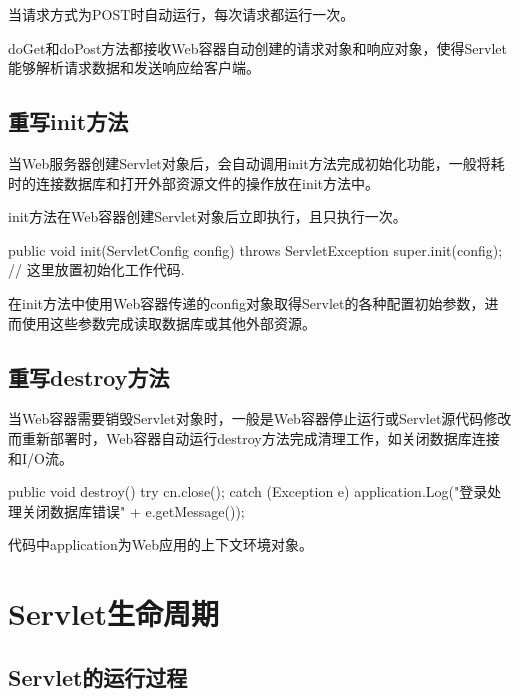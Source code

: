 当请求方式为POST时自动运行，每次请求都运行一次。

{\hei\Red doGet和doPost方法都接收Web容器自动创建的请求对象和响应对象，使得Servlet能够解析请求数据和发送响应给客户端。}

\subsection{重写init方法} 

当Web服务器创建Servlet对象后，会自动调用init方法完成初始化功能，一般将耗时的连接数据库和打开外部资源文件的操作放在init方法中。

init方法在Web容器创建Servlet对象后立即执行，且只执行一次。

\begin{javaCode}
  public void init(ServletConfig config) throws ServletException {
    super.init(config);
    // 这里放置初始化工作代码.
  }
\end{javaCode}

{\kai 在init方法中使用Web容器传递的config对象取得Servlet的各种配置初始参数，进而使用这些参数完成读取数据库或其他外部资源。}

\subsection{重写destroy方法} 

当Web容器需要销毁Servlet对象时，一般是Web容器停止运行或Servlet源代码修改而重新部署时，Web容器自动运行destroy方法完成清理工作，如关闭数据库连接和I/O流。

\begin{javaCode}
  public  void destroy() {
    try {
      cn.close();
    } catch (Exception e) {
      application.Log("登录处理关闭数据库错误" + e.getMessage());
    }
  }
\end{javaCode}

{\kai 代码中application为Web应用的上下文环境对象。}

\section{Servlet生命周期}

\subsection{Servlet的运行过程} 

